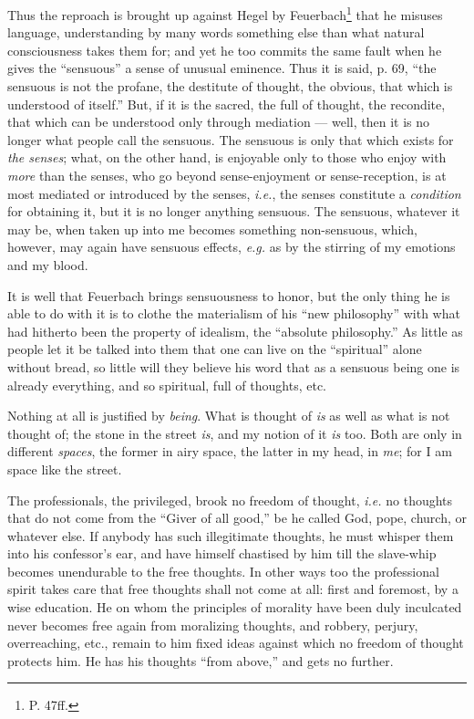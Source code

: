 Thus the reproach is brought up against Hegel by Feuerbach\footnote{P. 47ff.} 
that he misuses language, understanding by many words something else than what 
natural consciousness takes them for; and yet he too commits the same fault 
when he gives the ``sensuous'' a sense of unusual eminence. Thus it is said, 
p. 69, ``the sensuous is not the profane, the destitute of thought, the 
obvious, that which is understood of itself.'' But, if it is the sacred, the 
full of thought, the recondite, that which can be understood only through 
mediation --- well, then it is no longer what people call the sensuous. The 
sensuous is only that which exists for \textit{the senses}; what, on the other 
hand, is enjoyable only to those who enjoy with \textit{more} than the senses, 
who go beyond sense-enjoyment or sense-reception, is at most mediated or 
introduced by the senses, \textit{i.e.}, the senses constitute a 
\textit{condition} for obtaining it, but it is no longer anything sensuous. 
The sensuous, whatever it may be, when taken up into me becomes something 
non-sensuous, which, however, may again have sensuous effects, \textit{e.g.} 
as by the stirring of my emotions and my blood.

It is well that Feuerbach brings sensuousness to honor, but the only thing he 
is able to do with it is to clothe the materialism of his ``new philosophy'' 
with what had hitherto been the property of idealism, the ``absolute 
philosophy.'' As little as people let it be talked into them that one can 
live on the ``spiritual'' alone without bread, so little will they believe 
his word that as a sensuous being one is already everything, and so spiritual, 
full of thoughts, etc.

Nothing at all is justified by \textit{being}. What is thought of \textit{is} 
as well as what is not thought of; the stone in the street \textit{is}, and my 
notion of it \textit{is} too. Both are only in different \textit{spaces}, the 
former in airy space, the latter in my head, in \textit{me}; for I am space 
like the street.

The professionals, the privileged, brook no freedom of thought, \textit{i.e.} 
no thoughts that do not come from the ``Giver of all good,'' be he called 
God, pope, church, or whatever else. If anybody has such illegitimate 
thoughts, he must whisper them into his confessor's ear, and have himself 
chastised by him till the slave-whip becomes unendurable to the free thoughts. 
In other ways too the professional spirit takes care that free thoughts shall 
not come at all: first and foremost, by a wise education. He on whom the 
principles of morality have been duly inculcated never becomes free again from 
moralizing thoughts, and robbery, perjury, overreaching, etc., remain to him 
fixed ideas against which no freedom of thought protects him. He has his 
thoughts ``from above,'' and gets no further.

